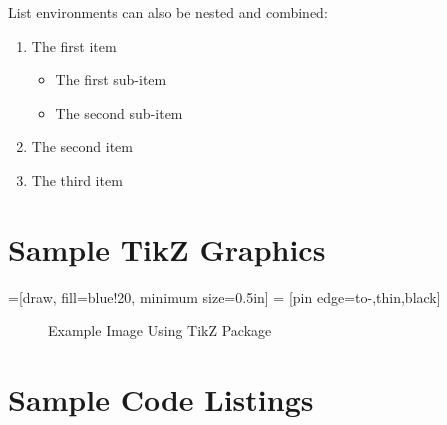 \documentclass[]{nasa-latex-docs}
\begin{document}
List environments can also be nested and combined:

\begin{enumerate}
   \item The first item
      \begin{itemize}[topsep=0pt]
         \item The first sub-item
         \item The second sub-item
      \end{itemize}
   \item The second item
   \item The third item
\end{enumerate}

\section{Sample TikZ Graphics}

\usetikzlibrary{arrows}
=[draw, fill=blue!20, minimum size=0.5in]
 = [pin edge={to-,thin,black}]

\begin{figure}[H]
      \caption{Example Image Using TikZ Package}
      \label{fig:block_diagram}
\end{figure}

\section{Sample Code Listings}


\end{document}
